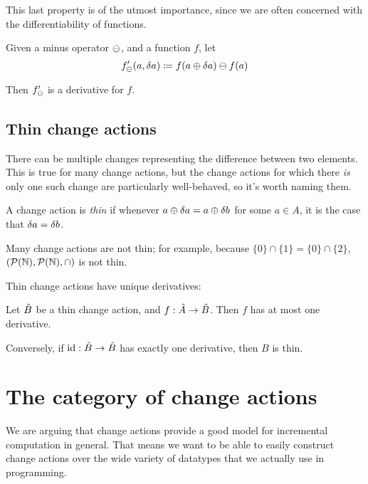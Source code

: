 This last property is of the utmost importance, since we are often concerned with the differentiability
of functions.

\begin{prop}
  Given a minus operator $\ominus$, and a function $f$, let
  \begin{displaymath}
    f'_\ominus(a, \delta a) \coloneqq f(a \oplus \delta a) \ominus f(a)
  \end{displaymath}

  Then $f'_\ominus$ is a derivative for $f$.
\end{prop}

\subsection{Thin change actions}
\label{sec:thin}

There can be multiple changes representing the difference
between two elements. This is true for many change actions, but the change
actions for which there \emph{is} only one such change are particularly
well-behaved, so it's worth naming them.

\begin{defn}
  A change action is \emph{thin} if whenever $a \oplus \delta a
  = a \oplus \delta b$ for some $a \in A$, it is the case that $\delta a = \delta b$.
\end{defn}

Many change actions are not thin; for example, because $\{0\} \cap \{1\} = \{0\}
\cap \{2\}$, $(\mathcal{P}(\mathbb{N}),\mathcal{P}(\mathbb{N}),\cap)$ is not thin.

Thin change actions have unique derivatives:

\begin{prop}
  Let $\hat{B}$ be a thin change action, and $f: \hat{A} \rightarrow \hat{B}$. Then $f$ has at
  most one derivative.

  Conversely, if $\textrm{id}: \hat{B} \rightarrow \hat{B}$ has exactly one derivative, then
  $B$ is thin.
\end{prop}

\section{The category of change actions}
\label{sec:category}

We are arguing that change actions provide a good model for incremental
computation in general. That means we want to be able to easily construct change
actions over the wide variety of datatypes that we actually use in programming.

